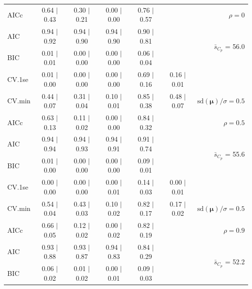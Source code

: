 \documentclass[12pt]{article}
\newcommand{\mr}[1]{\mathrm{#1}}
\newcommand{\bm}[1]{\mathbf{#1}}
\begin{document}
\begin{table}[p]
\begin{center}
\begin{tabular}{l*{5}{c}|r}
AICc & 0.64 $\mid$ 0.43 & 0.30 $\mid$ 0.21 & 0.00 $\mid$ 0.00 & 0.76 $\mid$ 0.57 & & $\rho=0$ \\
AIC & 0.94 $\mid$ 0.92 & 0.94 $\mid$ 0.90 & 0.94 $\mid$ 0.90 & 0.90 $\mid$ 0.81 & & \multirow{2}{*}{$\bar{s}_{C_p}$ = 56.0} \\
BIC & 0.01 $\mid$ 0.01 & 0.00 $\mid$ 0.00 & 0.00 $\mid$ 0.00 & 0.06 $\mid$ 0.04 & & \\
 \hline 
CV.1se & 0.01 $\mid$ 0.00 & 0.00 $\mid$ 0.00 & 0.00 $\mid$ 0.00 & 0.69 $\mid$ 0.16 & 0.16 $\mid$ 0.01 &\\
CV.min & 0.44 $\mid$ 0.07 & 0.31 $\mid$ 0.04 & 0.10 $\mid$ 0.01 & 0.85 $\mid$ 0.38 & 0.48 $\mid$ 0.07 &  $\mr{sd}(\bm{\mu})/\sigma=0.5$ \\
AICc & 0.63 $\mid$ 0.13 & 0.11 $\mid$ 0.02 & 0.00 $\mid$ 0.00 & 0.84 $\mid$ 0.32 & & $\rho=0.5$ \\
AIC & 0.94 $\mid$ 0.94 & 0.94 $\mid$ 0.93 & 0.94 $\mid$ 0.91 & 0.91 $\mid$ 0.74 & & \multirow{2}{*}{$\bar{s}_{C_p}$ = 55.6} \\
BIC & 0.01 $\mid$ 0.00 & 0.00 $\mid$ 0.00 & 0.00 $\mid$ 0.00 & 0.09 $\mid$ 0.01 & & \\
 \hline 
CV.1se & 0.00 $\mid$ 0.00 & 0.00 $\mid$ 0.00 & 0.00 $\mid$ 0.01 & 0.14 $\mid$ 0.03 & 0.00 $\mid$ 0.01 &\\
CV.min & 0.54 $\mid$ 0.04 & 0.43 $\mid$ 0.03 & 0.10 $\mid$ 0.02 & 0.82 $\mid$ 0.17 & 0.17 $\mid$ 0.02 &  $\mr{sd}(\bm{\mu})/\sigma=0.5$ \\
AICc & 0.66 $\mid$ 0.05 & 0.12 $\mid$ 0.02 & 0.00 $\mid$ 0.02 & 0.82 $\mid$ 0.19 & & $\rho=0.9$ \\
AIC & 0.93 $\mid$ 0.88 & 0.93 $\mid$ 0.87 & 0.94 $\mid$ 0.83 & 0.84 $\mid$ 0.29 & & \multirow{2}{*}{$\bar{s}_{C_p}$ = 52.2} \\
BIC & 0.06 $\mid$ 0.02 & 0.01 $\mid$ 0.02 & 0.00 $\mid$ 0.01 & 0.09 $\mid$ 0.03 & & \\
 \hline 
 \end{tabular}
\end{center}
\vspace{-1cm}
\end{table}
\end{document}
